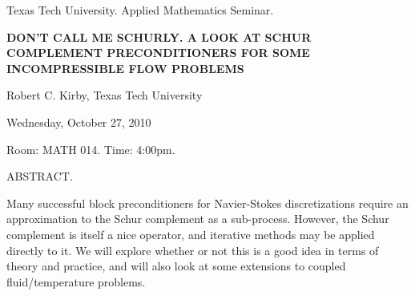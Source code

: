\documentclass[oneside]{amsart}
\newcommand{\talktitle}{Don't call me Schurly.  A look at Schur complement preconditioners  
for some incompressible flow problems}
\newcommand{\talkspeaker}{Robert C. Kirby, Texas Tech University}
\newcommand{\talkdate}{Wednesday, October 27, 2010}
\newcommand{\talkabstract}{
Many successful block preconditioners for Navier-Stokes  
discretizations require an approximation to the Schur complement as a  
sub-process.  However, the Schur complement is itself a nice operator,  
and iterative methods may be applied directly to it.  We will explore  
whether or not this is a good idea in terms of theory and practice,  
and will also look at some extensions to coupled fluid/temperature  
problems.
}
\begin{document}
\thispagestyle{empty}

\begin{center}
Texas Tech University.  Applied Mathematics Seminar.

\end{center}

\begin{center}

\textbf{\LARGE {\uppercase{\talktitle}} }

\talkspeaker

\talkdate

Room: MATH 014.  Time: 4:00pm.

\end{center}

ABSTRACT.
\talkabstract
\end{document}
